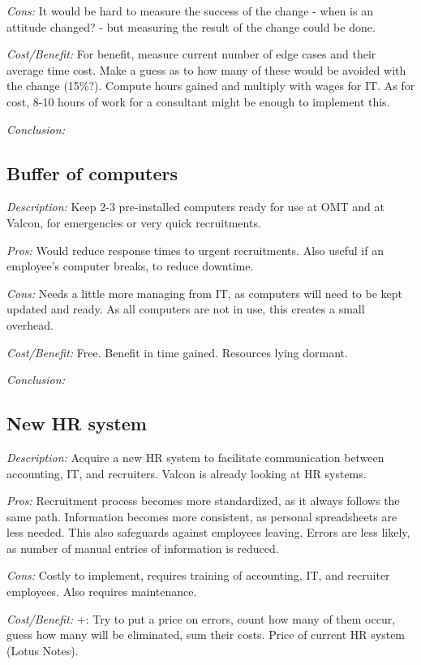\emph{Cons:} It would be hard to measure the success of the change - when is an attitude changed? - but measuring the result of the change could be done.

\emph{Cost/Benefit:} For benefit, measure current number of edge cases and their average time cost.
Make a guess as to how many of these would be avoided with the change (15\%?).
Compute hours gained and multiply with wages for IT.
As for cost, 8-10 hours of work for a consultant might be enough to implement this.

\emph{Conclusion:} 

\subsection{Buffer of computers}
\emph{Description:} Keep 2-3 pre-installed computers ready for use at OMT and at Valcon, for emergencies or very quick recruitments.

\emph{Pros:} Would reduce response times to urgent recruitments.
Also useful if an employee's computer breaks, to reduce downtime.

\emph{Cons:} Needs a little more managing from IT, as
computers will need to be kept updated and ready.
As all computers are not in use, this creates a small overhead.

\emph{Cost/Benefit:} Free. Benefit in time gained. Resources lying dormant.

\emph{Conclusion:}

\subsection{New HR system}
\emph{Description:} Acquire a new HR system to facilitate communication between accounting, IT, and recruiters.
Valcon is already looking at HR systems.

\emph{Pros:} Recruitment process becomes more standardized, as it always follows the same path.
Information becomes more consistent, as personal spreadsheets are less needed. 
This also safeguards against employees leaving.
Errors are less likely, as number of manual entries of information is reduced.

\emph{Cons:} Costly to implement, requires training of accounting, IT, and recruiter employees.
Also requires maintenance.

\emph{Cost/Benefit:} +: Try to put a price on errors, count how many of them occur, guess how many will be eliminated, sum their costs.
Price of current HR system (Lotus Notes).

